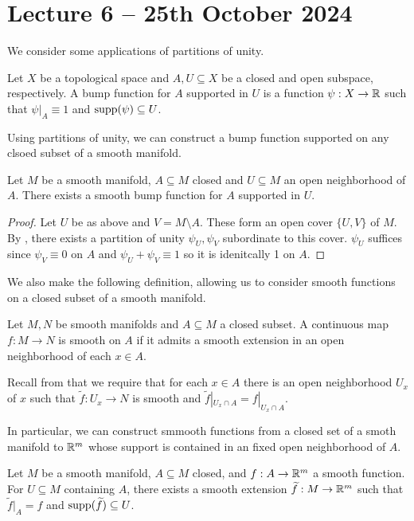 \section{Lecture 6 -- 25th October 2024}\label{sec: lecture 6}
We consider some applications of partitions of unity. 
\begin{definition}\label{def: bump function}
    Let $X$ be a topological space and $A,U\subseteq X$ be a closed and open subspace, respectively. A bump function for $A$ supported in $U$ is a function $\psi:X\to\mathbb{R}$ such that $\psi|_{A}\equiv1$ and $\mathrm{supp}(\psi)\subseteq U$. 
\end{definition}
Using partitions of unity, we can construct a bump function supported on any clsoed subset of a smooth manifold. 
\begin{proposition}\label{prop: existence of bump functions on smooth manifolds}
    Let $M$ be a smooth manifold, $A\subseteq M$ closed and $U\subseteq M$ an open neighborhood of $A$. There exists a smooth bump function for $A$ supported in $U$. 
\end{proposition}
\begin{proof}
    Let $U$ be as above and $V=M\setminus A$. These form an open cover $\{U,V\}$ of $M$. By , there exists a partition of unity $\psi_{U},\psi_{V}$ subordinate to this cover. $\psi_{U}$ suffices since $\psi_{V}\equiv0$ on $A$ and $\psi_{U}+\psi_{V}\equiv 1$ so it is idenitcally 1 on $A$.
\end{proof}
We also make the following definition, allowing us to consider smooth functions on a closed subset of a smooth manifold. 
\begin{definition}\label{def: smooth on closed}
    Let $M,N$ be smooth manifolds and $A\subseteq M$ a closed subset. A continuous map $f:M\to N$ is smooth on $A$ if it admits a smooth extension in an open neighborhood of each $x\in A$. 
\end{definition}
\begin{remark}
    Recall from  that we require that for each $x\in A$ there is an open neighborhood $U_{x}$ of $x$ such that $\widetilde{f}:U_{x}\to N$ is smooth and $\widetilde{f}|_{U_{x}\cap A}=f|_{U_{x}\cap A}$. 
\end{remark}
In particular, we can construct smmooth functions from a closed set of a smoth manifold to $\mathbb{R}^{m}$ whose support is contained in an fixed open neighborhood of $A$. 
\begin{proposition}\label{prop: smooth function on closed with fixed support}
    Let $M$ be a smooth manifold, $A\subseteq M$ closed, and $f:A\to\mathbb{R}^{m}$ a smooth function. For $U\subseteq M$ containing $A$, there exists a smooth extension $\widetilde{f}:M\to\mathbb{R}^{m}$ such that $\widetilde{f}|_{A}=f$ and $\mathrm{supp}(\widetilde{f})\subseteq U$. 
\end{proposition}
